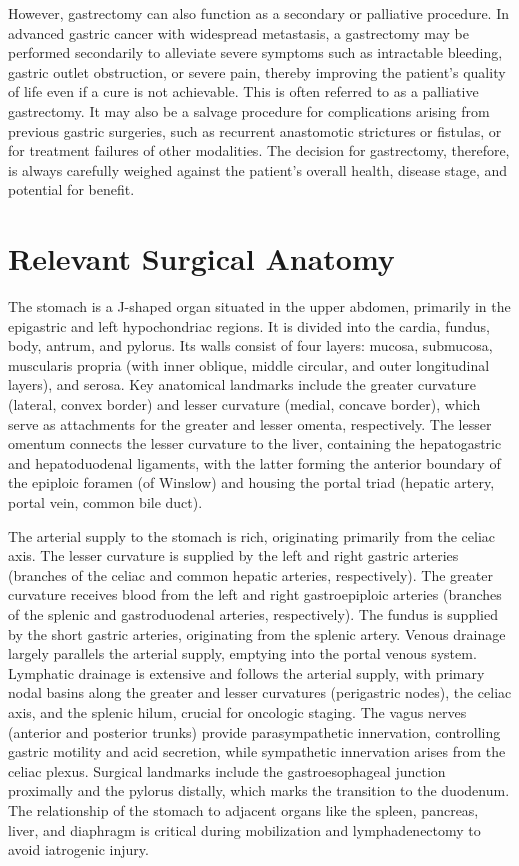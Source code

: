 However, gastrectomy can also function as a secondary or palliative procedure. In advanced gastric cancer with widespread metastasis, a gastrectomy may be performed secondarily to alleviate severe symptoms such as intractable bleeding, gastric outlet obstruction, or severe pain, thereby improving the patient's quality of life even if a cure is not achievable. This is often referred to as a palliative gastrectomy. It may also be a salvage procedure for complications arising from previous gastric surgeries, such as recurrent anastomotic strictures or fistulas, or for treatment failures of other modalities. The decision for gastrectomy, therefore, is always carefully weighed against the patient's overall health, disease stage, and potential for benefit.

\section*{Relevant Surgical Anatomy}
The stomach is a J-shaped organ situated in the upper abdomen, primarily in the epigastric and left hypochondriac regions. It is divided into the cardia, fundus, body, antrum, and pylorus. Its walls consist of four layers: mucosa, submucosa, muscularis propria (with inner oblique, middle circular, and outer longitudinal layers), and serosa. Key anatomical landmarks include the greater curvature (lateral, convex border) and lesser curvature (medial, concave border), which serve as attachments for the greater and lesser omenta, respectively. The lesser omentum connects the lesser curvature to the liver, containing the hepatogastric and hepatoduodenal ligaments, with the latter forming the anterior boundary of the epiploic foramen (of Winslow) and housing the portal triad (hepatic artery, portal vein, common bile duct).

The arterial supply to the stomach is rich, originating primarily from the celiac axis. The lesser curvature is supplied by the left and right gastric arteries (branches of the celiac and common hepatic arteries, respectively). The greater curvature receives blood from the left and right gastroepiploic arteries (branches of the splenic and gastroduodenal arteries, respectively). The fundus is supplied by the short gastric arteries, originating from the splenic artery. Venous drainage largely parallels the arterial supply, emptying into the portal venous system. Lymphatic drainage is extensive and follows the arterial supply, with primary nodal basins along the greater and lesser curvatures (perigastric nodes), the celiac axis, and the splenic hilum, crucial for oncologic staging. The vagus nerves (anterior and posterior trunks) provide parasympathetic innervation, controlling gastric motility and acid secretion, while sympathetic innervation arises from the celiac plexus. Surgical landmarks include the gastroesophageal junction proximally and the pylorus distally, which marks the transition to the duodenum. The relationship of the stomach to adjacent organs like the spleen, pancreas, liver, and diaphragm is critical during mobilization and lymphadenectomy to avoid iatrogenic injury.

